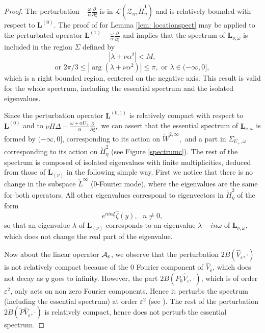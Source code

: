 \documentclass[11pt]{article}
\begin{document}
\begin{proof}
The perturbation $-\frac{\omega }{\alpha }\frac{\partial }{\partial \xi }$
is in $\mathcal{L}(\mathcal{Z}_{\eta},\mathring{H}_{\eta}^{1})$ and is
relatively bounded with respect to $\boldsymbol{L}^{(0)}.$ The proof of
for Lemma \ref{lem: locationspect} may be applied to the perturbated operator $%
\boldsymbol{L}^{(1)}-\frac{\omega }{\alpha }\frac{\partial }{\partial \xi }$
and implies that the spectrum of $\boldsymbol{L}_{\nu ,\omega }$ is included in
the region $\Sigma $ defined by%
\begin{equation*}
|\lambda +\nu \alpha ^{2}|<M,
\end{equation*}%
\begin{equation*}
\text{or } 2\pi /3 \leq |\arg (\lambda +\nu \alpha ^{2})|\leq \pi ,\text{ or }%
\lambda \in (-\infty ,0],
\end{equation*}%
which is a right bounded region, centered on the negative axis. This result
is valid for the whole spectrum, including the essential spectrum and the
isolated eigenvalues.

Since the perturbation operator $\boldsymbol{L}^{(0,1)}$ is relatively compact
with respect to $\boldsymbol{L}^{(0)}$ and to $\nu \Pi
\Delta -\frac{\omega+\alpha U_{+} }{\alpha }\frac{\partial }{\partial \xi },$ we can
assert that the essential spectrum of $\boldsymbol{L}_{\nu ,\omega }$ is
formed by $(-\infty ,0]$, corresponding to its action on  $\mathring{W}%
^{2,\infty },$ and a part in $\Sigma _{U_+,\omega }$ corresponding to its
action on $\mathring{H}_{\eta}^{2}$ (see Figure \ref{spectrumc}). The rest of
the spectrum is composed of isolated eigenvalues with finite multiplicities,
deduced from those of $\boldsymbol{L}_{(\nu )}$ in the following simple way.
First we notice that there is no change in the subspace $%
\mathring{L}^{\infty }$ (0-Fourier mode),  where the eigenvalues are the same for both operators.
All other eigenvalues correspond to eigenvectors in $\mathring{H}_{\eta}^{2}$
of the form 
\begin{equation*}
e^{ni\alpha \xi }\widehat{\zeta }(y),\text{ }n\neq 0,
\end{equation*}%
so that an eigenvalue $\lambda $ of $\boldsymbol{L}_{(\nu )}$ corresponds to
an eigenvalue $\lambda -in\omega $ of $\boldsymbol{L}_{\nu ,\omega },$ which
does not change the real part of the eigenvalue.

Now about the linear operator ${\cal A}_\varepsilon$, we observe that the perturbation $2 B(\hat{V}_\varepsilon,\cdot)$ is not relatively compact because of the $0$ Fourier component of $\hat{V}_\varepsilon$, which
does not decay as $y$ goes to infinity. However, the part 
$2 B(P_0 \hat{V}_\varepsilon,\cdot)$, which is of order $\varepsilon^2$,
only acts on non zero Fourier components. Hence it perturbs the spectrum
(including the essential spectrum) at order $\varepsilon^2$ (see \cite{Kato}).
The rest of the perturbation $2 B(\tilde{P} \hat{V}_\varepsilon,\cdot)$
is relatively compact, hence does not perturb the essential spectrum.


\end{proof}
\end{document}
